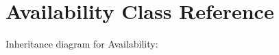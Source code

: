 \hypertarget{class_availability}{}\section{Availability Class Reference}
\label{class_availability}


Inheritance diagram for Availability\+:
